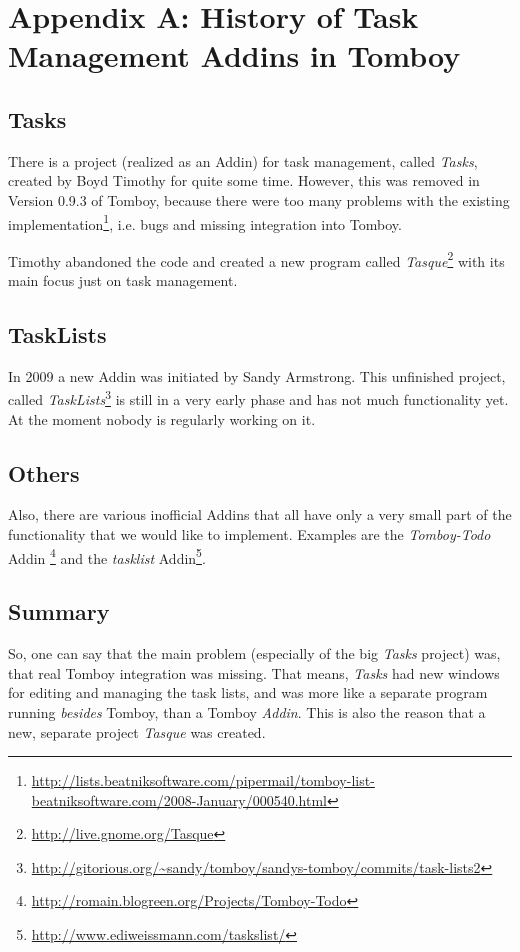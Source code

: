 \clearpage
\appendix
\section{Appendix A: History of Task Management Addins in Tomboy}

\label{appendix:history}
\subsection{Tasks}
There is a project (realized as an Addin) for task management, called \textit{Tasks}, created by Boyd Timothy for quite some time. However, this was removed in Version 0.9.3 of Tomboy, because there were too many problems with the existing implementation\footnote{\url{http://lists.beatniksoftware.com/pipermail/tomboy-list-beatniksoftware.com/2008-January/000540.html}}, i.e. bugs and missing integration into Tomboy.

Timothy abandoned the code and created a new program called \textit{Tasque}\footnote{\url{http://live.gnome.org/Tasque}} with its main focus just on task management.

\subsection{TaskLists}
In 2009 a new Addin was initiated by Sandy Armstrong. This unfinished project, called \textit{TaskLists}\footnote{\url{http://gitorious.org/~sandy/tomboy/sandys-tomboy/commits/task-lists2}} is still in a very early phase and has not much functionality yet. At the moment nobody is regularly working on it.

\subsection{Others}
Also, there are various inofficial Addins that all have only a very small part of the functionality that we would like to implement. Examples are the \textit{Tomboy-Todo} Addin \footnote{\url{http://romain.blogreen.org/Projects/Tomboy-Todo}} and the \textit{tasklist} Addin\footnote{\url{http://www.ediweissmann.com/taskslist/}}.

\subsection{Summary}
\label{lessons}
So, one can say that the main problem (especially of the big \textit{Tasks} project) was, that real Tomboy integration was missing. That means, \textit{Tasks} had new windows for editing and managing the task lists, and was more like a separate program running \textit{besides} Tomboy, than a Tomboy \textit{Addin}. This is also the reason that a new, separate project \textit{Tasque} was created.
